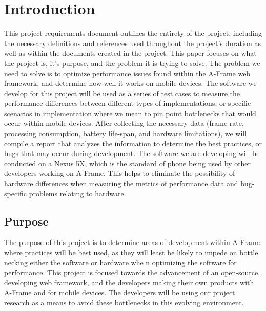 \documentclass[letterpaper,10pt,titlepage,draftclsnofoot,onecolumn,compsoc,utf8,latin1]{IEEEtran}
\begin{document}
\section{Introduction}
\begin{singlespace}
\noindent
This project requirements document outlines the entirety of the project, including the necessary definitions and references used throughout the project's duration as well as within the documents created in the project. This paper focuses on what the project is, it's purpose, and the problem it is trying to solve. The problem we need to solve is to optimize performance issues found within the A-Frame web framework, and determine how well it works on mobile devices. The software we develop for this project will be used as a series of test cases to measure the performance differences between different types of implementations, or specific scenarios in implementation where we mean to pin point bottlenecks that would occur within mobile devices. After collecting the necessary data (frame rate, processing consumption, battery life-span, and hardware limitations), we will compile a report that analyzes the information to determine the best practices, or bugs that may occur during development. The software we are developing will be conducted on a Nexus 5X, which is the standard of phone being used by other developers working on A-Frame. This helps to eliminate the possibility of hardware differences when measuring the metrics of performance data and bug-specific problems relating to hardware.
\end{singlespace}

\subsection{Purpose}
\begin{singlespace}
\noindent
The purpose of this project is to determine areas of development within A-Frame where practices will be best used, as they will least be likely to impede on bottle necking either the software or hardware whe n optimizing the software for performance. This project is focused towards the advancement of an open-source, developing web framework, and the developers making their own products with A-Frame and for mobile devices. The developers will be using our project research as a means to avoid these bottlenecks in this evolving environment.
\end{singlespace}
\end{document}
